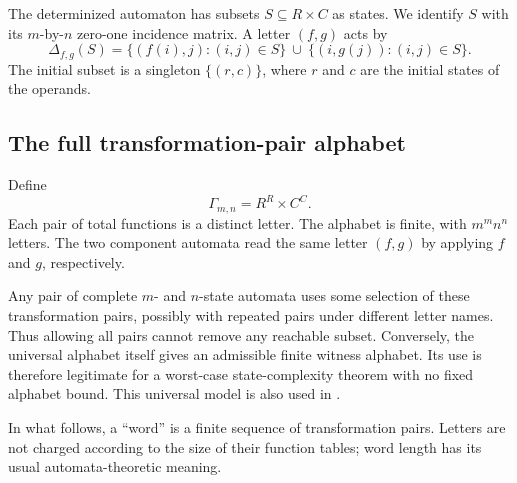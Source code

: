 \documentclass[11pt,letterpaper]{article}
\numberwithin{equation}{section}
\theoremstyle{definition}
\theoremstyle{remark}
\begin{document}
The determinized automaton has subsets $S\subseteq R\times C$ as states.
We identify $S$ with its $m$-by-$n$ zero-one incidence matrix. A letter
$(f,g)$ acts by
\begin{equation}\label{eq:Delta}
 \Delta_{f,g}(S)
 =\{(f(i),j):(i,j)\in S\}\ \cup\
   \{(i,g(j)):(i,j)\in S\}.
\end{equation}
The initial subset is a singleton $\{(r,c)\}$, where $r$ and $c$ are the
initial states of the operands.

\subsection{The full transformation-pair alphabet}
Define
\begin{equation}\label{eq:alphabet}
 \Gamma_{m,n}=R^R\times C^C.
\end{equation}
Each pair of total functions is a distinct letter. The alphabet is finite,
with $m^m n^n$ letters. The two component automata read the same letter
$(f,g)$ by applying $f$ and $g$, respectively.

Any pair of complete $m$- and $n$-state automata uses some selection of these
transformation pairs, possibly with repeated pairs under different letter
names. Thus allowing all pairs cannot remove any reachable subset.
Conversely, the universal alphabet itself gives an admissible finite
witness alphabet. Its use is therefore legitimate for a worst-case
state-complexity theorem with no fixed alphabet bound. This universal model
is also used in \cite[Section~2.1]{BJLRS2016}.

In what follows, a ``word'' is a finite sequence of transformation pairs.
Letters are not charged according to the size of their function tables;
word length has its usual automata-theoretic meaning.
\end{document}
